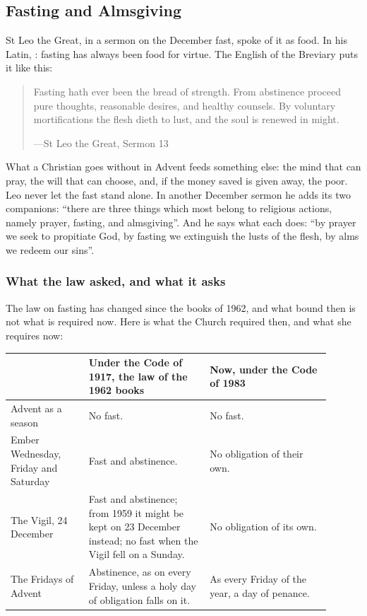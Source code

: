 \subsection{Fasting and Almsgiving}\label{sec:fasting}

St Leo the Great, in a sermon on the December fast, spoke of it as food. In
his Latin, : fasting has always been food for virtue. The English of the Breviary
puts it like this:

\begin{quote}
Fasting hath ever been the bread of strength. From abstinence proceed pure
thoughts, reasonable desires, and healthy counsels. By voluntary mortifications
the flesh dieth to lust, and the soul is renewed in might.\par
{\smallskip\noindent\small ---St Leo the Great, Sermon 13\par}
\end{quote}

What a Christian goes without in Advent feeds something else: the mind that can pray, the will that can choose, and, if the
money saved is given away, the poor. Leo never let the fast stand alone. In
another December sermon he adds its two companions: ``there are three things
which most belong to religious actions, namely prayer, fasting, and
almsgiving''. And he says what each does: ``by prayer we seek to propitiate
God, by fasting we extinguish the lusts of the flesh, by alms we redeem our
sins''.

\subsubsection*{What the law asked, and what it asks}

The law on fasting has changed since the books of 1962, and what bound then is
not what is required now. Here is what the Church required then, and what she
requires now:

\begin{center}
\small
\begin{tabular}{@{}>{\raggedright\arraybackslash}p{0.22\linewidth}>{\raggedright\arraybackslash}p{0.34\linewidth}>{\raggedright\arraybackslash}p{0.34\linewidth}@{}}
\toprule
& Under the Code of 1917, the law of the 1962 books & Now, under the Code of 1983 \\
\midrule
Advent as a season & No fast. & No fast. \\
\addlinespace
Ember Wednesday, Friday and Saturday & Fast and abstinence. & No obligation of their own. \\
\addlinespace
The Vigil, 24 December & Fast and abstinence; from 1959 it might be kept on 23 December instead; no fast when the Vigil fell on a Sunday. & No obligation of its own. \\
\addlinespace
The Fridays of Advent & Abstinence, as on every Friday, unless a holy day of obligation falls on it. & As every Friday of the year, a day of penance. \\
\bottomrule
\end{tabular}
\end{center}


